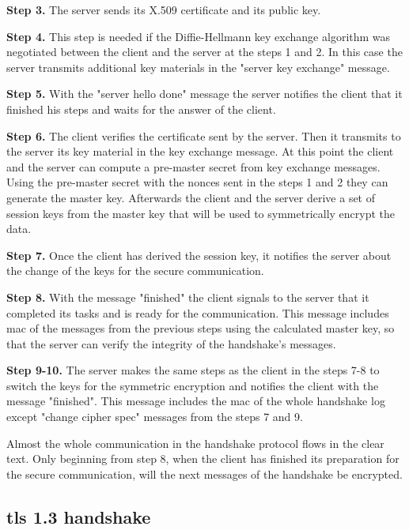 \textbf{Step 3.} The server sends its X.509 certificate and its public key.

\textbf{Step 4.} This step is needed if the Diffie-Hellmann key exchange algorithm was negotiated between the client and the server at the steps 1 and 2. In this case the server transmits additional key materials in the "server key exchange" message.

\textbf{Step 5.} With the "server hello done" message the server notifies the client that it finished his steps and waits for the answer of the client.

\textbf{Step 6.} The client verifies the certificate sent by the server. Then it transmits to the server its key material in the key exchange message. 
At this point the client and the server can compute a pre-master secret from key exchange messages. Using the pre-master secret with the nonces sent in the steps 1 and 2 they can generate the master key. Afterwards the client and the server derive a set of session keys from the master key that will be used to symmetrically encrypt the data.

\textbf{Step 7.} Once the client has derived the session key, it notifies the server about the change of the keys for the secure communication.

\textbf{Step 8.} With the message "finished" the client signals to the server that it completed its tasks and is ready for the communication. This message includes \gls{mac} of the messages from the previous steps using the calculated master key, so that the server can verify the integrity of the handshake's messages.

\textbf{Step 9-10.} The server makes the same steps as the client in the steps 7-8 to switch the keys for the symmetric encryption and notifies the client with the message "finished". This message includes the \gls{mac} of the whole handshake log except "change cipher spec" messages from the steps 7 and 9. \cite{sslstore:handshake}\cite{Hassenstein}

Almost the whole communication in the handshake protocol flows in the clear text. Only beginning from step 8, when the client has finished its preparation for the secure communication, will the next messages of the handshake be encrypted.

\subsection{\gls{tls} 1.3 handshake}
\label{subsec:handshake1_3}

